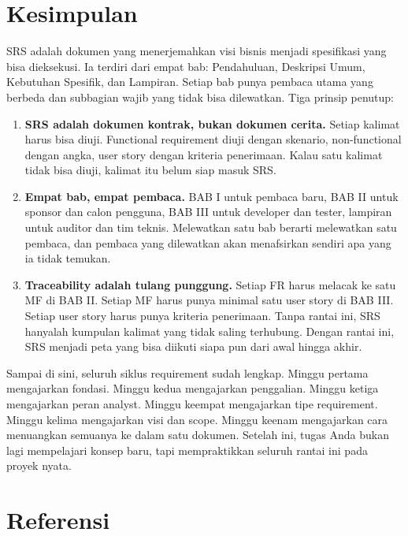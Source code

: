 \documentclass[11pt,a4paper]{article}
\begin{document}
\section{Kesimpulan}

SRS adalah dokumen yang menerjemahkan visi bisnis menjadi spesifikasi yang bisa dieksekusi. Ia terdiri dari empat bab: Pendahuluan, Deskripsi Umum, Kebutuhan Spesifik, dan Lampiran. Setiap bab punya pembaca utama yang berbeda dan subbagian wajib yang tidak bisa dilewatkan. Tiga prinsip penutup:

\begin{enumerate}
	\item \textbf{SRS adalah dokumen kontrak, bukan dokumen cerita.} Setiap kalimat harus bisa diuji. Functional requirement diuji dengan skenario, non-functional dengan angka, user story dengan kriteria penerimaan. Kalau satu kalimat tidak bisa diuji, kalimat itu belum siap masuk SRS.
	\item \textbf{Empat bab, empat pembaca.} BAB I untuk pembaca baru, BAB II untuk sponsor dan calon pengguna, BAB III untuk developer dan tester, lampiran untuk auditor dan tim teknis. Melewatkan satu bab berarti melewatkan satu pembaca, dan pembaca yang dilewatkan akan menafsirkan sendiri apa yang ia tidak temukan.
	\item \textbf{Traceability adalah tulang punggung.} Setiap FR harus melacak ke satu MF di BAB II. Setiap MF harus punya minimal satu user story di BAB III. Setiap user story harus punya kriteria penerimaan. Tanpa rantai ini, SRS hanyalah kumpulan kalimat yang tidak saling terhubung. Dengan rantai ini, SRS menjadi peta yang bisa diikuti siapa pun dari awal hingga akhir.
\end{enumerate}

Sampai di sini, seluruh siklus requirement sudah lengkap. Minggu pertama mengajarkan fondasi. Minggu kedua mengajarkan penggalian. Minggu ketiga mengajarkan peran analyst. Minggu keempat mengajarkan tipe requirement. Minggu kelima mengajarkan visi dan scope. Minggu keenam mengajarkan cara menuangkan semuanya ke dalam satu dokumen. Setelah ini, tugas Anda bukan lagi mempelajari konsep baru, tapi mempraktikkan seluruh rantai ini pada proyek nyata.

\newpage
\section*{Referensi}
\end{document}
